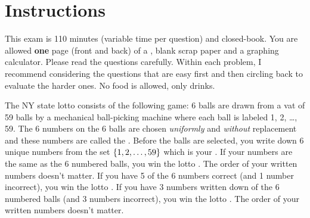 \documentclass[12pt,landscape]{article}
\begin{document}
\section*{Instructions}
This exam is 110 minutes (variable time per question) and closed-book. You are allowed \textbf{one} page (front and back) of a , blank scrap paper and a graphing calculator. Please read the questions carefully. Within each problem, I recommend considering the questions that are easy first and then circling back to evaluate the harder ones. No food is allowed, only drinks. %

\pagebreak



\problem{} The NY state lotto consists of the following game: 6 balls are drawn from a vat of 59 balls by a mechanical ball-picking machine where each ball is labeled 1, 2, \ldots, 59. The 6 numbers on the 6 balls are chosen \emph{uniformly} and \emph{without} replacement and these numbers are called the . Before the balls are selected, you write down 6 unique numbers from the set $\left\{1, 2, \ldots, 59\right\}$ which is your . If your numbers are the same as the 6 numbered balls, you win the lotto . The order of your written numbers doesn't matter. If you have 5 of the 6 numbers correct (and 1 number incorrect), you win the lotto . If you have 3 numbers written down of the 6 numbered balls (and 3 numbers incorrect), you win the lotto . The order of your written numbers doesn't matter.
\end{document}
